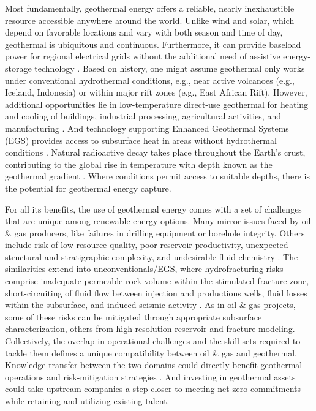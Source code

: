 Most fundamentally, geothermal energy offers a reliable, nearly inexhaustible resource accessible anywhere around the world. Unlike wind and solar, which depend on favorable locations and vary with both season and time of day, geothermal is ubiquitous and continuous. Furthermore, it can provide baseload power for regional electrical grids without the additional need of assistive energy-storage technology \citep{tester_future_2006}. Based on history, one might assume geothermal only works under conventional hydrothermal conditions, e.g., near active volcanoes (e.g., Iceland, Indonesia) or within major rift zones (e.g., East African Rift). However, additional opportunities lie in low-temperature direct-use geothermal for heating and cooling of buildings, industrial processing, agricultural activities, and manufacturing \citep[p.\ 9]{glassley_geothermal_2015}. And technology supporting Enhanced Geothermal Systems (EGS) provides access to subsurface heat in areas without hydrothermal conditions \citep{tester_future_2006}. Natural radioactive decay takes place throughout the Earth’s crust, contributing to the global rise in temperature with depth known as the geothermal gradient \citep[p.\ 279]{fowler_solid_2005}. Where conditions permit access to suitable depths, there is the potential for geothermal energy capture.

For all its benefits, the use of geothermal energy comes with a set of challenges that are unique among renewable energy options. Many mirror issues faced by oil \& gas producers, like failures in drilling equipment or borehole integrity. Others include risk of low resource quality, poor reservoir productivity, unexpected structural and stratigraphic complexity, and undesirable fluid chemistry \citep{beckers_low-temperature_2016, hadi_resource_2010}. The similarities extend into unconventionals/EGS, where hydrofracturing risks comprise inadequate permeable rock volume within the stimulated fracture zone, short-circuiting of fluid flow between injection and productions wells, fluid losses within the subsurface, and induced seismic activity \citep{jelacic_evaluation_2008,pan_establishment_2019}. As in oil \& gas projects, some of these risks can be mitigated through appropriate subsurface characterization, others from high-resolution reservoir and fracture modeling. Collectively, the overlap in operational challenges and the skill sets required to tackle them defines a unique compatibility between oil \& gas and geothermal. Knowledge transfer between the two domains could directly benefit geothermal operations and risk-mitigation strategies \citep{petty_synergies_2009}. And investing in geothermal assets could take upstream companies a step closer to meeting net-zero commitments while retaining and utilizing existing talent.

